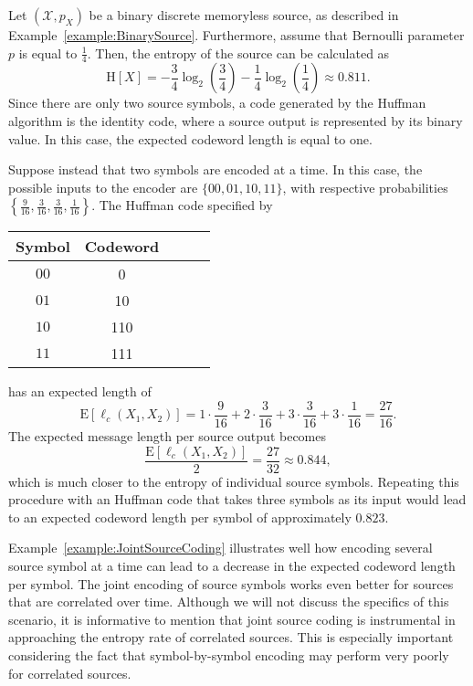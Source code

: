 \begin{example} \label{example:JointSourceCoding}
Let $(\mathcal{X}, p_X)$ be a binary discrete memoryless source, as described in Example~\ref{example:BinarySource}.
Furthermore, assume that Bernoulli parameter $p$ is equal to $\frac{1}{4}$.
Then, the entropy of the source can be calculated as
\begin{equation*}
\mathrm{H}[X] = - \frac{3}{4} \log_2 \left( \frac{3}{4} \right)
- \frac{1}{4} \log_2 \left( \frac{1}{4} \right)
\approx 0.811 .
\end{equation*}
Since there are only two source symbols, a code generated by the Huffman algorithm is the identity code, where a source output is represented by its binary value.
In this case, the expected codeword length is equal to one.

Suppose instead that two symbols are encoded at a time.
In this case, the possible inputs to the encoder are $\{ 00, 01, 10, 11 \}$, with respective probabilities $\left\{ \frac{9}{16}, \frac{3}{16}, \frac{3}{16}, \frac{1}{16} \right\}$.
The Huffman code specified by
\begin{center}
\begin{tabular}{|c|c|c|c|c|}
\hline
Symbol & Codeword \\
\hline
$00$ & 0 \\
$01$ & 10 \\
$10$ & 110 \\
$11$ & 111 \\
\hline
\end{tabular}
\end{center}
has an expected length of
\begin{equation*}
\mathrm{E} [\ell_c (X_1, X_2)] = 1 \cdot \frac{9}{16} + 2 \cdot \frac{3}{16}
+ 3 \cdot \frac{3}{16} + 3 \cdot \frac{1}{16}
= \frac{27}{16} . 
\end{equation*}
The expected message length per source output becomes
\begin{equation*}
\frac{\mathrm{E} [\ell_c (X_1, X_2)]}{2} = \frac{27}{32} \approx 0.844 ,
\end{equation*}
which is much closer to the entropy of individual source symbols.
Repeating this procedure with an Huffman code that takes three symbols as its input would lead to an expected codeword length per symbol of approximately $0.823$.
\end{example}

Example~\ref{example:JointSourceCoding} illustrates well how encoding several source symbol at a time can lead to a decrease in the expected codeword length per symbol.
The joint encoding of source symbols works even better for sources that are correlated over time.
Although we will not discuss the specifics of this scenario, it is informative to mention that joint source coding is instrumental in approaching the entropy rate of correlated sources.
This is especially important considering the fact that symbol-by-symbol encoding may perform very poorly for correlated sources.


